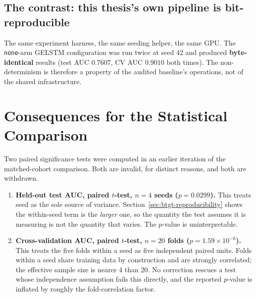 \subsection{The contrast: this thesis's own pipeline is bit-reproducible}

The same experiment harness, the same seeding helper, the same GPU. The \texttt{none}-arm
GELSTM configuration was run twice at seed 42 and produced \textbf{byte-identical} results
(test AUC $0.7607$, CV AUC $0.9010$ both times). The non-determinism is therefore a
property of the audited baseline's operations, not of the shared infrastructure.



\section{Consequences for the Statistical Comparison}
\label{sec:btgt-stats}

Two paired significance tests were computed in an earlier iteration of the matched-cohort
comparison. Both are invalid, for distinct reasons, and both are withdrawn.

\begin{enumerate}
  \item \textbf{Held-out test AUC, paired $t$-test, $n = 4$ seeds ($p = 0.0299$).} This
    treats seed as the sole source of variance. Section~\ref{sec:btgt-reproducibility}
    shows the within-seed term is the \emph{larger} one, so the quantity the test assumes
    it is measuring is not the quantity that varies. The $p$-value is uninterpretable.
  \item \textbf{Cross-validation AUC, paired $t$-test, $n = 20$ folds
    ($p = 1.59 \times 10^{-6}$).} This treats the five folds within a seed as five
    independent paired units. Folds within a seed share training data by construction and
    are strongly correlated; the effective sample size is nearer 4 than 20. No correction
    rescues a test whose independence assumption fails this directly, and the reported
    $p$-value is inflated by roughly the fold-correlation factor.
\end{enumerate}

